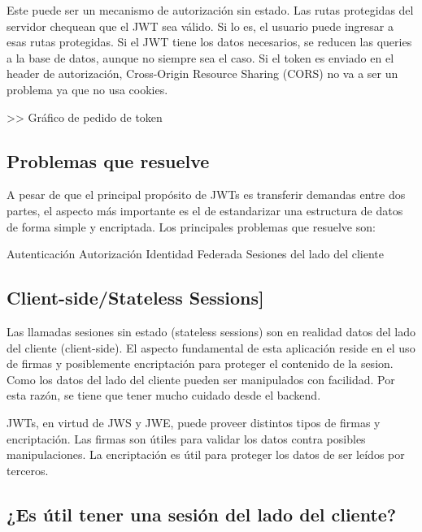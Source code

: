 Este puede ser un mecanismo de autorización sin estado. Las rutas protegidas del servidor chequean que el JWT sea válido. Si lo es, el usuario puede ingresar a esas rutas protegidas. Si el JWT tiene los datos necesarios, se reducen las queries a la base de datos, aunque no siempre sea el caso.
Si el token es enviado en el header de autorización, Cross-Origin Resource Sharing (CORS) no va a ser un problema ya que no usa cookies.

>> Gráfico de pedido de token



\subsection[Problemas que resuelve]{Problemas que resuelve}

A pesar de que el principal propósito de JWTs es transferir demandas entre dos partes, el aspecto más importante es el de estandarizar una estructura de datos de forma simple y encriptada. 
Los principales problemas que resuelve son:
\begin{outline}
\2 Autenticación
\2 Autorización
\2 Identidad Federada
\2 Sesiones del lado del cliente
\end{outline}

\subsection[Client-side/Stateless Sessions]{Client-side/Stateless Sessions]}

Las llamadas sesiones sin estado (stateless sessions) son en realidad datos del lado del cliente (client-side). El aspecto fundamental de esta aplicación reside en el uso de firmas y posiblemente encriptación para proteger el contenido de la sesion. Como los datos del lado del cliente pueden ser manipulados con facilidad. Por esta razón, se tiene que tener mucho cuidado desde el backend.

JWTs, en virtud de JWS y JWE, puede proveer distintos tipos de firmas y encriptación. Las firmas son útiles para validar los datos contra posibles manipulaciones. La encriptación es útil para proteger los datos de ser leídos por terceros.

\subsection[¿Es útil tener una sesión del lado del cliente?]{¿Es útil tener una sesión del lado del cliente?}

